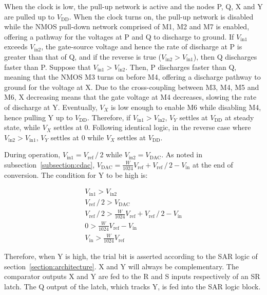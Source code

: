 \documentclass[12pt, a4paper]{article}
\begin{document}
When the clock is low, the pull-up network is active and the nodes P, Q, X and Y are pulled up to $V_\mathrm{DD}$. When the clock turns on, 
the pull-up network is disabled while the NMOS pull-down network comprised of M1, M2 and M7 is enabled, offering a pathway for the voltages at P and Q to discharge to ground. If $V_\mathrm{in1}$ exceeds $V_\mathrm{in2}$, the gate-source voltage and hence the rate of discharge at P is
greater than that of Q, and if the reverse is true ($V_\mathrm{in2} > V_\mathrm{in1}$), then Q discharges faster than P. Suppose that $V_\mathrm{in1} > V_\mathrm{in2}$.
Then, P discharges faster than Q, meaning that the NMOS M3 turns on before M4, offering a discharge pathway to ground for the voltage at X. 
Due to the cross-coupling between M3, M4, M5 and M6, X decreasing means that the gate voltage at M4 decreases, slowing the rate of discharge at Y.
Eventually, $V_X$ is low enough to enable M6 while disabling M4, hence pulling Y up to $V_\mathrm{DD}$. Therefore, if $V_\mathrm{in1} > V_\mathrm{in2}$, $V_Y$ settles at $V_\mathrm{DD}$
at steady state, while $V_X$ settles at 0. Following identical logic, in the reverse case where $V_\mathrm{in2} > V_\mathrm{in1}$, $V_{Y}$ settles at 0 while $V_{X}$ settles at $V_\mathrm{DD}$.

During operation, $V_\mathrm{in1} = V_\mathrm{ref} \, / \, 2$ while $V_\mathrm{in2} = V_\mathrm{DAC}$. As noted in subsection~\ref{subsection:cdac}, $V_\mathrm{DAC} = \frac{W}{1024} V_\mathrm{ref} + V_\mathrm{ref} \, / \, 2 - V_\mathrm{in}$ at the end of conversion. The condition for Y to be high is:

\begin{gather}
    V_\mathrm{in1} > V_\mathrm{in2} \nonumber \\
    V_\mathrm{ref} \, / \, 2 > V_\mathrm{DAC} \nonumber \\
    V_\mathrm{ref} \, / \, 2 > \frac{W}{1024} V_\mathrm{ref} + V_\mathrm{ref} \, / \, 2 - V_\mathrm{in} \nonumber \\
    0 > \frac{W}{1024} V_\mathrm{ref} - V_\mathrm{in} \nonumber \\
    \boxed{V_\mathrm{in} > \frac{W}{1024} V_\mathrm{ref}} \label{eq:comp_eqn}
\end{gather}

Therefore, when Y is high, the trial bit is asserted according to the SAR logic of section~\ref{section:architecture}. X and Y will always be complementary. The comparator outputs X and Y are fed to the R and S inputs respectively of an SR latch. The Q output of the latch, which tracks Y, is fed into the SAR logic block.
\end{document}
